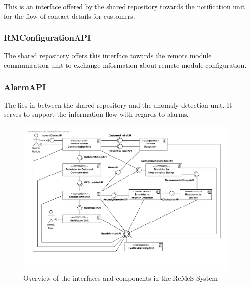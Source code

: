 \npar This is an interface offered by the shared repository towards the
notification unit for the flow of contact details for customers.

\subsubsection{RMConfigurationAPI}

\npar The shared repository offers this interface towards the remote module
communication unit to exchange information about remote module configuration.

\subsubsection{AlarmAPI}

\npar The  lies in between the shared repository and the
anomaly detection unit. It serves to support the information flow with regards
to alarms.

\begin{figure}[H]
	\begin{centering}
		\includegraphics[height=\textwidth,angle=90]{figs/add-it1-interfaces.pdf}
		\caption{Overview of the interfaces and components in the ReMeS
		System}
		\label{fig:it1/interfaces}
	\end{centering}
\end{figure}

